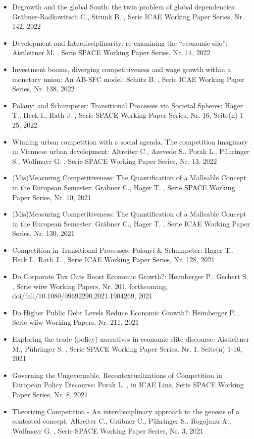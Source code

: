 \begin{itemize}
\item Degrowth and the global South: the twin problem of global dependencies: Gräbner-Radkowitsch C., Strunk B. , Serie ICAE Working Paper Series, Nr. 142, 2022
\item Development and Interdisciplinarity: re-examining the “economic silo”: Aistleitner M. , Serie SPACE Working Paper Series, Nr. 14, 2022
\item Investment booms, diverging competitiveness and wage growth within a monetary union: An AB-SFC model: Schütz B. , Serie ICAE Working Paper Series, Nr. 138, 2022
\item Polanyi and Schumpeter: Transitional Processes via Societal Spheres: Hager T., Heck I., Rath J. , Serie SPACE Working Paper Series, Nr. 16, Seite(n) 1-25, 2022
\item Winning urban competition with a social agenda. The competition imaginary in Viennese urban development: Altreiter C., Azevedo S., Porak L., Pühringer S., Wolfmayr G. , Serie SPACE Working Paper Series, Nr. 13, 2022
\item (Mis)Measuring Competitiveness: The Quantification of a Malleable Concept in the European Semester: Gräbner C., Hager T. , Serie SPACE Working Paper Series, Nr. 10, 2021
\item (Mis)Measuring Competitiveness: The Quantification of a Malleable Concept in the European Semester: Gräbner C., Hager T. , Serie ICAE Working Paper Series, Nr. 130, 2021
\item Competition in Transitional Processes: Polanyi & Schumpeter: Hager T., Heck I., Rath J. , Serie ICAE Working Paper Series, Nr. 128, 2021
\item Do Corporate Tax Cuts Boost Economic Growth?: Heimberger P., Gechert S. , Serie wiiw Working Papers, Nr. 201, forthcoming, doi/full/10.1080/09692290.2021.1904269, 2021
\item Do Higher Public Debt Levels Reduce Economic Growth?: Heimberger P. , Serie wiiw Working Papers, Nr. 211, 2021
\item Exploring the trade (policy) narratives in economic elite discourse: Aistleitner M., Pühringer S. , Serie SPACE Working Paper Series, Nr. 1, Seite(n) 1-16, 2021
\item Governing the Ungovernable. Recontextualizations of Competition in European Policy Discourse: Porak L. , in ICAE Linz, Serie SPACE Working Paper Series, Nr. 8, 2021
\item Theorizing Competition - An interdisciplinary approach to the genesis of a contested concept: Altreiter C., Gräbner C., Pühringer S., Rogojanu A., Wolfmayr G. , Serie SPACE Working Paper Series, Nr. 3, 2021

\end{itemize}
